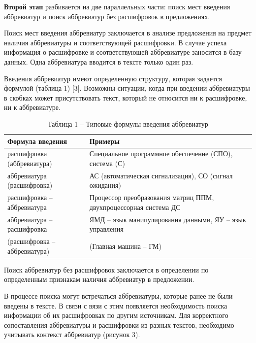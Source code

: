 \documentclass[12pt]{article}
\begin{document}
\indent \textbf{Второй этап} разбивается на две параллельных части: поиск мест введения аббревиатур и поиск аббревиатур без расшифровок в предложениях.

\indent Поиск мест введения аббревиатур заключается в анализе предложения на предмет наличия аббревиатуры и соответствующей расшифровки. В случае успеха информация о расшифровке и соответствующей аббревиатуре заносится в базу данных. Одна аббревиатура вводится в тексте только один раз.

\indent Введения аббревиатур имеют определенную структуру, которая задается формулой (таблица 1) [3]. Возможны ситуации, когда при введении аббревиатуры в скобках может присутствовать текст, который не относится ни к расшифровке, ни к аббревиатуре.

\begin{table}[h!]
\centering
\caption{Таблица 1 – Типовые формулы введения аббревиатур}
\begin{tabular}{|>{\centering\arraybackslash}p{4cm}|>{\raggedright\arraybackslash}p{8cm}|}
\hline
\textbf{Формула введения} & \textbf{Примеры} \\
\hline
расшифровка (аббревиатура) & Специальное программное обеспечение (СПО), система (С) \\
\hline
аббревиатура (расшифровка) & АС (автоматическая сигнализация), СО (сигнал ожидания) \\
\hline
расшифровка – аббревиатура & Процессор преобразования матриц ППМ, двухпроцессорная система ДС \\
\hline
аббревиатура – расшифровка & ЯМД – язык манипулирования данными, ЯУ – язык управления \\
\hline
(расшифровка – аббревиатура) & (Главная машина – ГМ) \\
\hline
\end{tabular}
\end{table}

\indent Поиск аббревиатур без расшифровок заключается в определении по определенным признакам наличия аббревиатур в предложении.

\indent В процессе поиска могут встречаться аббревиатуры, которые ранее не были введены в тексте. В связи с
вязи с этим появляется необходимость поиска информации об их расшифровках по другим источникам. Для корректного сопоставления аббревиатуры и расшифровки из разных текстов, необходимо учитывать контекст аббревиатур (рисунок 3).
\end{document}
